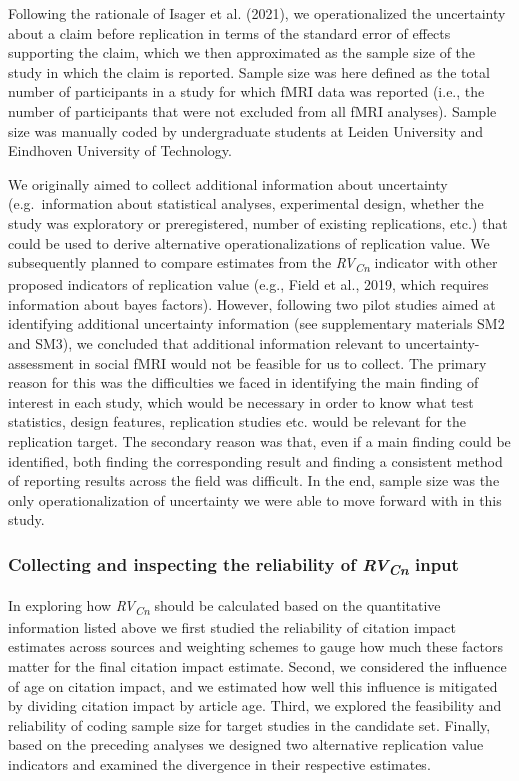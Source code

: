 \documentclass[
  english,
  man,floatsintext]{apa6}
\begin{document}
Following the rationale of Isager et al. (2021), we operationalized the uncertainty about a claim before replication in terms of the standard error of effects supporting the claim, which we then approximated as the sample size of the study in which the claim is reported. Sample size was here defined as the total number of participants in a study for which fMRI data was reported (i.e., the number of participants that were not excluded from all fMRI analyses). Sample size was manually coded by undergraduate students at Leiden University and Eindhoven University of Technology.

We originally aimed to collect additional information about uncertainty (e.g.~information about statistical analyses, experimental design, whether the study was exploratory or preregistered, number of existing replications, etc.) that could be used to derive alternative operationalizations of replication value. We subsequently planned to compare estimates from the \emph{RV\textsubscript{Cn}} indicator with other proposed indicators of replication value (e.g., Field et al., 2019, which requires information about bayes factors). However, following two pilot studies aimed at identifying additional uncertainty information (see supplementary materials SM2 and SM3), we concluded that additional information relevant to uncertainty-assessment in social fMRI would not be feasible for us to collect. The primary reason for this was the difficulties we faced in identifying the main finding of interest in each study, which would be necessary in order to know what test statistics, design features, replication studies etc. would be relevant for the replication target. The secondary reason was that, even if a main finding could be identified, both finding the corresponding result and finding a consistent method of reporting results across the field was difficult. In the end, sample size was the only operationalization of uncertainty we were able to move forward with in this study.

\hypertarget{collecting-and-inspecting-the-reliability-of-rvcn-input}{%
\subsubsection{\texorpdfstring{Collecting and inspecting the reliability of \emph{RV\textsubscript{Cn}} input}{Collecting and inspecting the reliability of RVCn input}}\label{collecting-and-inspecting-the-reliability-of-rvcn-input}}

In exploring how \emph{RV\textsubscript{Cn}} should be calculated based on the quantitative information listed above we first studied the reliability of citation impact estimates across sources and weighting schemes to gauge how much these factors matter for the final citation impact estimate. Second, we considered the influence of age on citation impact, and we estimated how well this influence is mitigated by dividing citation impact by article age. Third, we explored the feasibility and reliability of coding sample size for target studies in the candidate set. Finally, based on the preceding analyses we designed two alternative replication value indicators and examined the divergence in their respective estimates.
\end{document}
